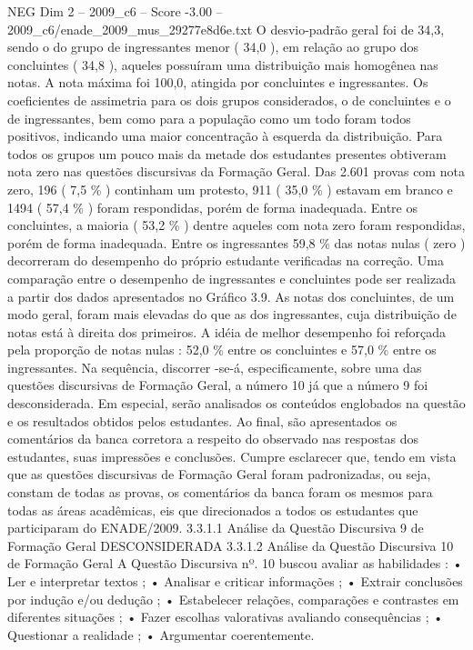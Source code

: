 \begin{textsample}{NEG Dim 2 – 2009\_c6 – Score -3.00 – 2009\_c6/enade\_2009\_mus\_29277e8d6e.txt}
O desvio-padrão geral foi de 34,3, sendo o do grupo de ingressantes menor ( 34,0 ), em relação ao grupo dos concluintes ( 34,8 ), aqueles possuíram uma distribuição mais homogênea nas notas.
A nota máxima foi 100,0, atingida por concluintes e ingressantes.
Os coeficientes de assimetria para os dois grupos considerados, o de concluintes e o de ingressantes, bem como para a população como um todo foram todos positivos, indicando uma maior concentração à esquerda da distribuição.
Para todos os grupos um pouco mais da metade dos estudantes presentes obtiveram nota zero nas questões discursivas da Formação Geral.
Das 2.601 provas com nota zero, 196 ( 7,5 \% ) continham um protesto, 911 ( 35,0 \% ) estavam em branco e 1494 ( 57,4 \% ) foram respondidas, porém de forma inadequada.
Entre os concluintes, a maioria ( 53,2 \% ) dentre aqueles com nota zero foram respondidas, porém de forma inadequada.
Entre os ingressantes 59,8 \% das notas nulas ( zero ) decorreram do desempenho do próprio estudante verificadas na correção.
Uma comparação entre o desempenho de ingressantes e concluintes pode ser realizada a partir dos dados apresentados no Gráfico 3.9.
As notas dos concluintes, de um modo geral, foram mais elevadas do que as dos ingressantes, cuja distribuição de notas está à direita dos primeiros.
A idéia de melhor desempenho foi reforçada pela proporção de notas nulas : 52,0 \% entre os concluintes e 57,0 \% entre os ingressantes.
Na sequência, discorrer -se-á, especificamente, sobre uma das questões discursivas de Formação Geral, a número 10 já que a número 9 foi desconsiderada.
Em especial, serão analisados os conteúdos englobados na questão e os resultados obtidos pelos estudantes.
Ao final, são apresentados os comentários da banca corretora a respeito do observado nas respostas dos estudantes, suas impressões e conclusões.
Cumpre esclarecer que, tendo em vista que as questões discursivas de Formação Geral foram padronizadas, ou seja, constam de todas as provas, os comentários da banca foram os mesmos para todas as áreas acadêmicas, eis que direcionados a todos os estudantes que participaram do ENADE/2009. 3.3.1.1 Análise da Questão Discursiva 9 de Formação Geral DESCONSIDERADA 3.3.1.2 Análise da Questão Discursiva 10 de Formação Geral A Questão Discursiva nº. 10 buscou avaliar as habilidades : • Ler e interpretar textos ; • Analisar e criticar informações ; • Extrair conclusões por indução e/ou dedução ; • Estabelecer relações, comparações e contrastes em diferentes situações ; • Fazer escolhas valorativas avaliando consequências ; • Questionar a realidade ; • Argumentar coerentemente.

\end{textsample}
